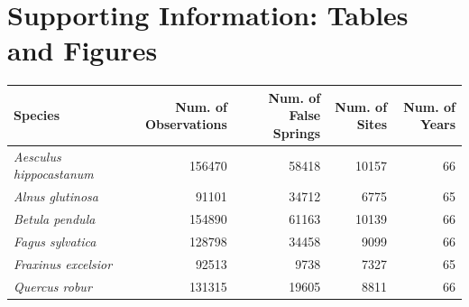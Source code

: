 \documentclass{article}\usepackage[]{graphicx}\usepackage[]{color}
\begin{document}

\newpage
\nocite{NPN2019}


\newpage
\section*{Supporting Information: Tables and Figures}
  
\begin{center}
 \label{tab:spp} 
\begin{tabular}{l r r r r}
\hline
Species & Num. of Observations & Num. of False Springs & Num. of Sites & Num. of Years \\
\hline
\textit{Aesculus hippocastanum} & 156470 & 58418 & 10157 & 66  \\
\textit{Alnus glutinosa} & 91101 & 34712 & 6775 & 65 \\
\textit{Betula pendula} & 154890 & 61163 & 10139 & 66 \\
\textit{Fagus sylvatica} & 128798 & 34458 & 9099 & 66 \\
\textit{Fraxinus excelsior} & 92513 & 9738 & 7327 & 65 \\
\textit{Quercus robur} & 131315 & 19605 & 8811 & 66 \\
\hline
\end{tabular}
\end{center}

\vspace{15ex}
\end{document}

